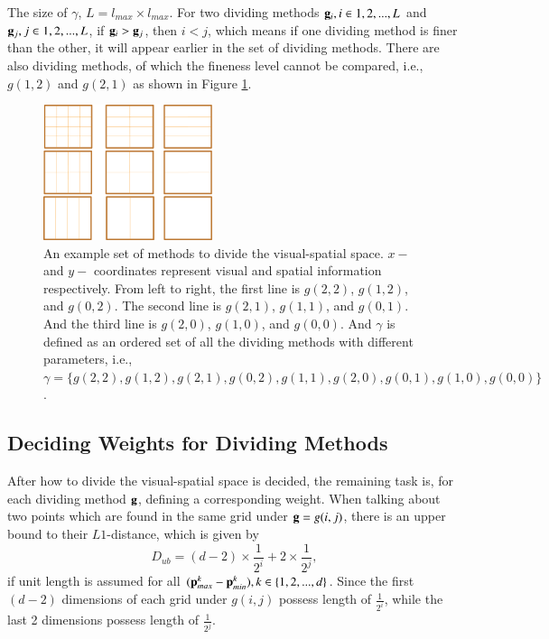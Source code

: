 \documentclass[paper]{ieice}
\begin{document}
The size of $\gamma$, $L=l_{max} \times l_{max}$. For two dividing methods ${\bf g}_i,i \in {1,2,...,L}$ and ${\bf g}_j,j \in {1,2,...,L}$, if ${\bf g}_i>{\bf g}_j$, then $i<j$, which means if one dividing method is finer than the other, it will appear earlier in the set of dividing methods. There are also dividing methods, of which the fineness level cannot be compared, i.e., $g(1,2)$ and $g(2,1)$ as shown in Figure \ref{fig:p3}.


\begin{figure}
\centering
\includegraphics[width=0.44\textwidth]{pms3.eps}
\caption[Visual-spatial space dividing]{An example set of methods to divide the visual-spatial space. $x-$ and $y-$ coordinates represent visual and spatial information respectively. From left to right, the first line is $g(2,2)$, $g(1,2)$, and $g(0,2)$. The second line is $g(2,1)$, $g(1,1)$, and $g(0,1)$. And the third line is $g(2,0)$, $g(1,0)$, and $g(0,0)$. And $\gamma$ is defined as an ordered set of all the dividing methods with different parameters, i.e., $\gamma=\{g(2,2),g(1,2),g(2,1),g(0,2),g(1,1),g(2,0),g(0,1),g(1,0),g(0,0)\}$.}
\label{fig:p3}
\end{figure}



\subsection{Deciding Weights for Dividing Methods}
After how to divide the visual-spatial space is decided, the remaining task is, for each dividing method $\bf g$, defining a corresponding weight.
When talking about two points which are found in the same grid under ${\bf g}=g(i,j)$, there is an upper bound to their $L1$-distance, which is given by
\[D_{ub}=  {(d-2)\times \frac 1 {2^i} +2\times \frac 1 {2^j} } ,
\]
 if unit length is assumed for all $({\bf p}_{max}^k - {\bf p}_{min}^k ),k \in \{1,2,...,d\}$. Since the first $(d-2)$ dimensions of each grid under $g(i,j)$ possess length of $\frac 1 {2^i}$, while the last 2 dimensions possess length of  $\frac 1 {2^j}$.
\end{document}
